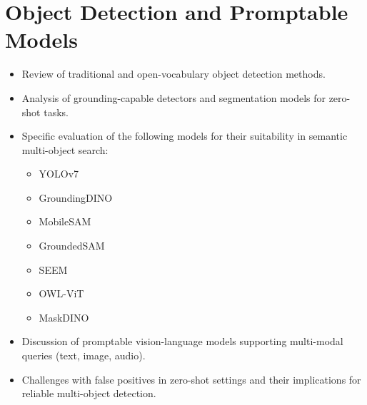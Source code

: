 \section{Object Detection and Promptable Models}
\begin{itemize}
    \item Review of traditional and open-vocabulary object detection methods.
    \item Analysis of grounding-capable detectors and segmentation models for zero-shot tasks.
    \item Specific evaluation of the following models for their suitability in semantic multi-object search:
    \begin{itemize}
        \item YOLOv7
        \item GroundingDINO
        \item MobileSAM
        \item GroundedSAM
        \item SEEM
        \item OWL-ViT
        \item MaskDINO
    \end{itemize}
    \item Discussion of promptable vision-language models supporting multi-modal queries (text, image, audio).
    \item Challenges with false positives in zero-shot settings and their implications for reliable multi-object detection.
\end{itemize}

